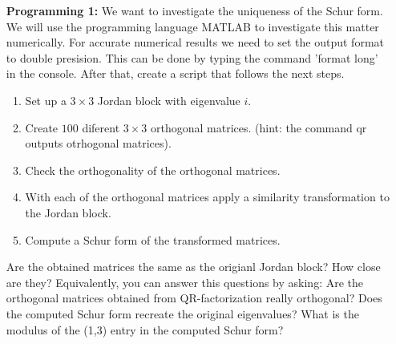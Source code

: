 \documentclass[14pt]{report}
\begin{document}
\begin{enumerate}
  \item[\textbf{Programming 1:}] We want to investigate the uniqueness
    of the Schur form. We will use the programming language MATLAB to 
    investigate this matter numerically. For accurate numerical results we 
    need to set the output format to double presision. This can be done by
    typing the command 'format long' in the console. After that, create a
    script that follows the next steps.
    \begin{enumerate}
      \item Set up a $3\times3$ Jordan block with eigenvalue $i$.
      \item Create $100$ diferent $3\times3$ orthogonal matrices. (hint: the
        command qr outputs otrhogonal matrices).
      \item Check the orthogonality of the orthogonal matrices.
      \item With each of the orthogonal matrices apply a similarity
        transformation to the Jordan block.
      \item Compute a Schur form of the transformed matrices.
    \end{enumerate}
    Are the obtained matrices the same as the origianl Jordan block? How
    close are they? Equivalently, you can answer this questions by asking: 
    Are the orthogonal matrices obtained from QR-factorization really
    orthogonal? Does the computed Schur form recreate the original eigenvalues?
    What is the modulus of the (1,3) entry in the computed Schur form?

  \end{enumerate}
\end{document}
